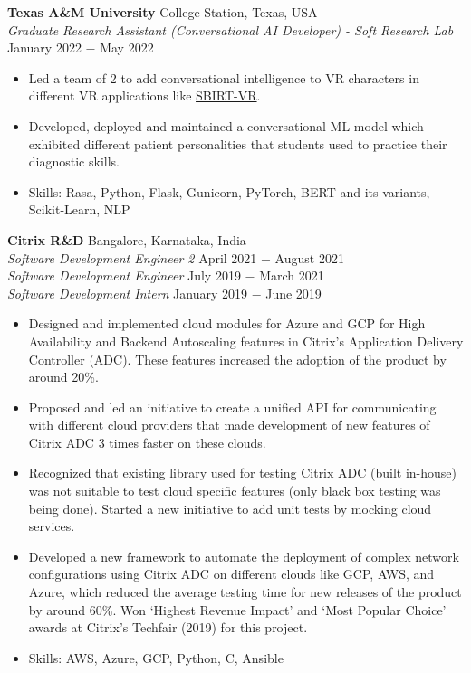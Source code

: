 \documentclass{article}
\begin{document}
\noindent \textbf{Texas A\&M University} \hfill College Station, Texas, USA\\
\textit{Graduate Research Assistant (Conversational AI Developer) - Soft Research Lab} \hfill January 2022 $-$ May 2022
\begin{itemize}[noitemsep,nolistsep,leftmargin=*]
\item {Led a team of 2 to add conversational intelligence to VR characters in different VR applications like \href{https://softinteraction.com/portfolio/sbirt-vr}{SBIRT-VR}}.
\item {Developed, deployed and maintained a conversational ML model which exhibited different patient personalities that students used to practice their diagnostic skills.}
\item Skills: Rasa, Python, Flask, Gunicorn, PyTorch, BERT and its variants, Scikit-Learn, NLP\\

\end{itemize}
\noindent \textbf{Citrix R\&D} \hfill Bangalore, Karnataka, India \\
\textit{Software Development Engineer 2} \hfill April 2021 $-$ August 2021 \\
\textit{Software Development Engineer} \hfill July 2019 $-$ March 2021 \\
\textit{Software Development Intern} \hfill January 2019 $-$ June 2019
\begin{itemize}[noitemsep,nolistsep,leftmargin=*]
\item {Designed and implemented cloud modules for Azure and GCP for High Availability and Backend Autoscaling features in Citrix's Application Delivery Controller (ADC). These features increased the adoption of the product by around 20\%.}
\item {Proposed and led an initiative to create a unified API for communicating with different cloud providers that made development of new features of Citrix ADC 3 times faster on these clouds.}
\item {Recognized that existing library used for testing Citrix ADC (built in-house) was not suitable to test cloud specific features (only black box testing was being done). Started a new initiative to add unit tests by mocking cloud services.}
\item {Developed a new framework to automate the deployment of complex network configurations using Citrix ADC on different clouds like GCP, AWS, and Azure, which reduced the average testing time for new releases of the product by around 60\%. Won `Highest Revenue Impact' and `Most Popular Choice' awards at Citrix's Techfair (2019) for this project.}
\item {Skills: AWS, Azure, GCP, Python, C, Ansible\\}
\end{itemize}
\end{document}
